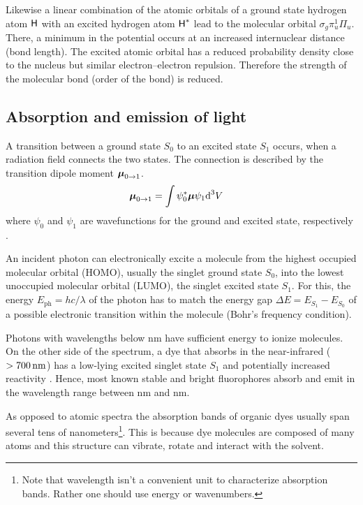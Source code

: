 Likewise a linear combination of the atomic orbitals of a ground state
hydrogen atom $\textsf{H}$ with an excited hydrogen atom $\textsf{H}^*$ lead to the
molecular orbital $\sigma_g\pi_u^1\Pi_u$. There, a minimum in the
potential occurs at an increased internuclear distance (bond
length). The excited atomic orbital has a reduced probability density
close to the nucleus but similar electron--electron
repulsion. Therefore the strength of the molecular bond (order of the
bond) is reduced.
\newcommand{\vmu}{\mbox{\boldmath{$\mu$}}}
\subsection{Absorption and emission of light}
A transition between a ground state $S_0$ to an excited state $S_1$
occurs, when a radiation field connects the two states. The connection
is described by the transition dipole moment
$\vmu_{0\rightarrow 1}$.
\begin{align}
  \vmu_{0\rightarrow 1} &= \int \psi^*_0 \vmu \psi_1 \textrm{d}^3V
\end{align}
where $\psi_0$ and $\psi_1$ are wavefunctions for the ground and
excited state, respectively \citep{Klessinger1989}.

An incident photon can electronically excite a molecule from the
highest occupied molecular orbital (HOMO), usually the singlet ground
state $S_0$, into the lowest unoccupied molecular orbital (LUMO), the
singlet excited state $S_1$. For this, the energy $E_\textrm{ph}=hc/\lambda$ of the
photon has to match the energy gap $\Delta E=E_{S_1}-E_{S_0}$ of a
possible electronic transition within the molecule (Bohr's frequency
condition).

Photons with wavelengths below \unit[200]{nm} have sufficient energy
to ionize molecules. On the other side of the spectrum, a dye that
absorbs in the near-infrared ($\unit[>700]{nm}$) has a low-lying
excited singlet state $S_1$ and potentially increased reactivity
\citep{Sauer2011}. Hence, most known stable and bright fluorophores
absorb and emit in the wavelength range between \unit[300]{nm} and
\unit[700]{nm}.

As opposed to atomic spectra the absorption bands of organic dyes
usually span several tens of nanometers\footnote{Note that wavelength
  isn't a convenient unit to characterize absorption bands. Rather one
  should use energy or wavenumbers.}. This is because dye molecules
are composed of many atoms and this structure can vibrate, rotate and
interact with the solvent.
